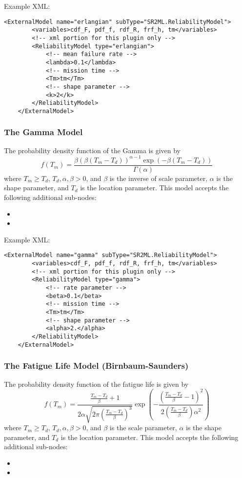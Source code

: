 Example XML:
\begin{lstlisting}[style=XML]
	<ExternalModel name="erlangian" subType="SR2ML.ReliabilityModel">
		<variables>cdf_F, pdf_f, rdf_R, frf_h, tm</variables>
		<!-- xml portion for this plugin only -->
		<ReliabilityModel type="erlangian">
			<!-- mean failure rate -->
			<lambda>0.1</lambda>
			<!-- mission time -->
			<Tm>tm</Tm>
			<!-- shape parameter -->
			<k>2</k>
		</ReliabilityModel>
	</ExternalModel>
\end{lstlisting}


\subsubsection{The Gamma Model}
The probability density function of the Gamma is given by
\begin{equation}
	f(T_m) = \frac{\beta \left(\beta \left(T_m-T_d\right)\right)^{\alpha-1}\exp\left(-\beta\left(T_m-T_d\right)\right)}{\Gamma \left(\alpha\right)}
\end{equation}
where $T_m\geq T_d$, $T_d, \alpha, \beta >0$, and $\beta$ is the inverse of scale parameter, $\alpha$ is the shape
parameter, and $T_d$ is the location parameter.
This model accepts the following additional sub-nodes:
\begin{itemize}
	\item {}
	\item {}
\end{itemize}

Example XML:
\begin{lstlisting}[style=XML]
	<ExternalModel name="gamma" subType="SR2ML.ReliabilityModel">
		<variables>cdf_F, pdf_f, rdf_R, frf_h, tm</variables>
		<!-- xml portion for this plugin only -->
		<ReliabilityModel type="gamma">
			<!-- rate parameter -->
			<beta>0.1</beta>
			<!-- mission time -->
			<Tm>tm</Tm>
			<!-- shape parameter -->
			<alpha>2.</alpha>
		</ReliabilityModel>
	</ExternalModel>
\end{lstlisting}


\subsubsection{The Fatigue Life Model (Birnbaum-Saunders)}
The probability density function of the fatigue life is given by
\begin{equation}
	f(T_m) = \frac{\frac{T_m-T_d}{\beta}+1}{2\alpha\sqrt{2\pi\left(\frac{T_m-T_d}{\beta}\right)^3}}
				 \exp\left(-\frac{\left(\frac{T_m-T_d}{\beta}-1\right)^2}{2\left(\frac{T_m-T_d}{\beta}\right)\alpha^2}\right)
\end{equation}
where $T_m\geq T_d$, $T_d, \alpha, \beta >0$, and $\beta$ is the scale parameter, $\alpha$ is the shape
parameter, and $T_d$ is the location parameter.
This model accepts the following additional sub-nodes:
\begin{itemize}
	\item {}
	\item {}
\end{itemize}

